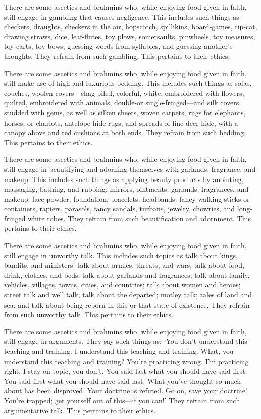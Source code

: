 \documentclass[12pt,openany]{book}%
\begin{document}
There are some ascetics and brahmins who, while enjoying food given in faith, still engage in gambling that causes negligence. This includes such things as checkers, draughts, checkers in the air, hopscotch, spillikins, board-games, tip-cat, drawing straws, dice, leaf-flutes, toy plows, somersaults, pinwheels, toy measures, toy carts, toy bows, guessing words from syllables, and guessing another’s thoughts. They refrain from such gambling. This pertains to their ethics. 

There are some ascetics and brahmins who, while enjoying food given in faith, still make use of high and luxurious bedding. This includes such things as sofas, couches, woolen covers—shag-piled, colorful, white, embroidered with flowers, quilted, embroidered with animals, double-or single-fringed—and silk covers studded with gems, as well as silken sheets, woven carpets, rugs for elephants, horses, or chariots, antelope hide rugs, and spreads of fine deer hide, with a canopy above and red cushions at both ends. They refrain from such bedding. This pertains to their ethics. 

There are some ascetics and brahmins who, while enjoying food given in faith, still engage in beautifying and adorning themselves with garlands, fragrance, and makeup. This includes such things as applying beauty products by anointing, massaging, bathing, and rubbing; mirrors, ointments, garlands, fragrances, and makeup; face-powder, foundation, bracelets, headbands, fancy walking-sticks or containers, rapiers, parasols, fancy sandals, turbans, jewelry, chowries, and long-fringed white robes. They refrain from such beautification and adornment. This pertains to their ethics. 

There are some ascetics and brahmins who, while enjoying food given in faith, still engage in unworthy talk. This includes such topics as talk about kings, bandits, and ministers; talk about armies, threats, and wars; talk about food, drink, clothes, and beds; talk about garlands and fragrances; talk about family, vehicles, villages, towns, cities, and countries; talk about women and heroes; street talk and well talk; talk about the departed; motley talk; tales of land and sea; and talk about being reborn in this or that state of existence. They refrain from such unworthy talk. This pertains to their ethics. 

There are some ascetics and brahmins who, while enjoying food given in faith, still engage in arguments. They say such things as: ‘You don’t understand this teaching and training. I understand this teaching and training. What, you understand this teaching and training? You’re practicing wrong. I’m practicing right. I stay on topic, you don’t. You said last what you should have said first. You said first what you should have said last. What you’ve thought so much about has been disproved. Your doctrine is refuted. Go on, save your doctrine! You’re trapped; get yourself out of this—if you can!’ They refrain from such argumentative talk. This pertains to their ethics. 
\end{document}
